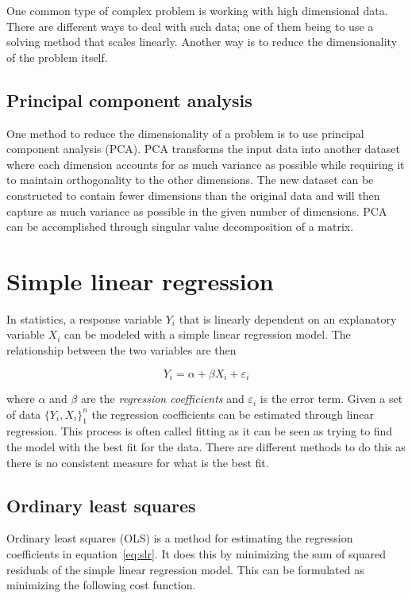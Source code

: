 \documentclass[a4paper]{report}
\begin{document}
One common type of complex problem is working with high dimensional data. There
are different ways to deal with such data; one of them being to use a solving
method that scales linearly. Another way is to reduce the dimensionality of the
problem itself.

\subsection{Principal component analysis}
One method to reduce the dimensionality of a problem is to use principal
component analysis (PCA). PCA transforms the input data into another dataset
where each dimension accounts for as much variance as possible while requiring
it to maintain orthogonality to the other dimensions. The new dataset can be
constructed to contain fewer dimensions than the original data and will then
capture as much variance as possible in the given number of dimensions. PCA can
be accomplished through singular value decomposition of a matrix.

\section{Simple linear regression}
In statistics, a response variable $Y_i$ that is linearly dependent on an
explanatory variable $X_i$ can be modeled with a simple linear regression
model. The relationship between the two variables are then

\begin{equation}
    Y_i = \alpha + \beta X_i + \varepsilon_i
    \label{eq:slr}
\end{equation}

where $\alpha$ and $\beta$ are the \emph{regression coefficients} and
$\varepsilon_i$ is the error term. Given a set of data
$\displaystyle \{Y_i, X_i\}_1^n$ the regression coefficients can be estimated
through linear regression. This process is often called fitting as it can be
seen as trying to find the model with the best fit for the data. There are
different methods to do this as there is no consistent measure for what is the
best fit.

\subsection{Ordinary least squares}
Ordinary least squares (OLS) is a method for estimating the regression
coefficients in equation~\ref{eq:slr}. It does this by minimizing the sum of
squared residuals of the simple linear regression model. This can be formulated
as minimizing the following cost function.
\end{document}
